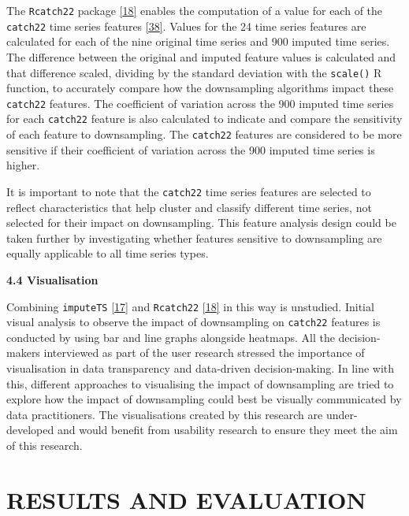 \documentclass{article}
\begin{document}
The \texttt{Rcatch22} package
\protect\hyperlink{ref-catch22_R}{{[}18{]}} enables the computation of a
value for each of the \texttt{catch22} time series features
\protect\hyperlink{ref-catch22}{{[}38{]}}. Values for the 24 time series
features are calculated for each of the nine original time series and
900 imputed time series. The difference between the original and imputed
feature values is calculated and that difference scaled, dividing by the
standard deviation with the \texttt{scale()} R function, to accurately
compare how the downsampling algorithms impact these \texttt{catch22}
features. The coefficient of variation across the 900 imputed time
series for each \texttt{catch22} feature is also calculated to indicate
and compare the sensitivity of each feature to downsampling. The
\texttt{catch22} features are considered to be more sensitive if their
coefficient of variation across the 900 imputed time series is higher.

It is important to note that the \texttt{catch22} time series features
are selected to reflect characteristics that help cluster and classify
different time series, not selected for their impact on downsampling.
This feature analysis design could be taken further by investigating
whether features sensitive to downsampling are equally applicable to all
time series types.

\textbf{4.4 Visualisation}

Combining \texttt{imputeTS} \protect\hyperlink{ref-imputeTS_R}{{[}17{]}}
and \texttt{Rcatch22} \protect\hyperlink{ref-catch22_R}{{[}18{]}} in
this way is unstudied. Initial visual analysis to observe the impact of
downsampling on \texttt{catch22} features is conducted by using bar and
line graphs alongside heatmaps. All the decision-makers interviewed as
part of the user research stressed the importance of visualisation in
data transparency and data-driven decision-making. In line with this,
different approaches to visualising the impact of downsampling are tried
to explore how the impact of downsampling could best be visually
communicated by data practitioners. The visualisations created by this
research are under-developed and would benefit from usability research
to ensure they meet the aim of this research.

\hypertarget{results-and-evaluation}{%
\section{RESULTS AND EVALUATION}\label{results-and-evaluation}}
\end{document}
